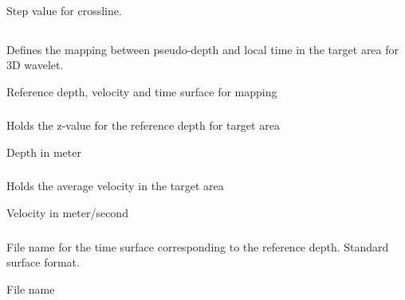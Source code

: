 \paragraph{}
 \slist
   \item \Description Step value for crossline.
   \item \Argument
   \item \Default
 \elist

\subsection{} 
 \slist
   \item \Description Defines the mapping between pseudo-depth and local time in the target area for 3D wavelet.
   \item \Argument Reference depth, velocity and time surface for mapping
   \item \Default
 \elist

\subsubsection{} 
 \slist
   \item \Description Holds the z-value for the reference depth for target area
   \item \Argument Depth in meter
   \item \Default
\elist

\subsubsection{} 
 \slist
   \item \Description Holds the average velocity in the target area
   \item \Argument Velocity in meter/second
   \item \Default
\elist

\subsubsection{} 
 \slist
   \item \Description File name for the time surface corresponding to the reference depth. Standard surface format.
   \item \Argument File name
   \item \Default
\elist

